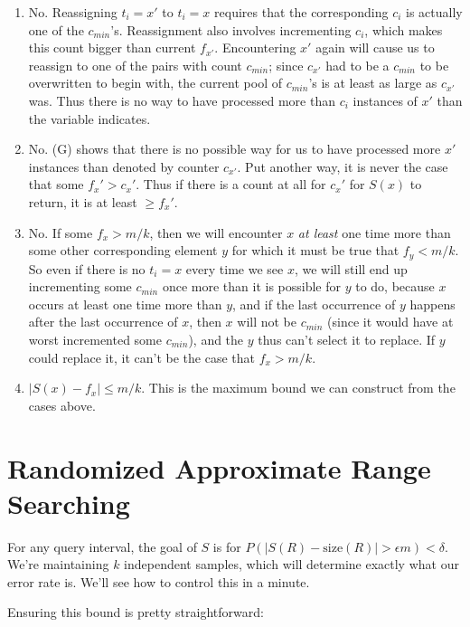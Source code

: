 \documentclass[fleqn]{article}
\begin{document}
\begin{enumerate}
\item No. Reassigning $t_i = x'$ to $t_i = x$ requires that the corresponding $c_i$ is actually one of the $c_{min}$'s. Reassignment also involves incrementing $c_i$, which makes this count bigger than current $f_{x'}$. Encountering $x'$ again will cause us to reassign to one of the pairs with count $c_{min}$; since $c_{x'}$ had to be a $c_{min}$ to be overwritten to begin with, the current pool of $c_{min}$'s is at least as large as $c_{x'}$ was. Thus there is no way to have processed more than $c_i$ instances of $x'$ than the variable indicates.

\item No. (G) shows that there is no possible way for us to have processed more $x'$ instances than denoted by counter $c_{x'}$. Put another way, it is never the case that some $f_x' > c_x'$. Thus if there is a count at all for $c_x'$ for $S(x)$ to return, it is at least $\ge f_x'$.

\item No. If some $f_x > m/k$, then we will encounter $x$ \textit{at least} one time more than some other corresponding element $y$ for which it must be true that $f_{y} < m/k$. So even if there is no $t_i = x$ every time we see $x$, we will still end up incrementing some $c_{min}$ once more than it is possible for $y$ to do, because $x$ occurs at least one time more than $y$, and if the last occurrence of $y$ happens after the last occurrence of $x$, then $x$ will not be $c_{min}$ (since it would have at worst incremented some $c_{min}$), and the $y$ thus can't select it to replace. If $y$ could replace it, it can't be the case that $f_x > m/k$.

\item $|S(x) - f_x| \le m/k$. This is the maximum bound we can construct from the cases above.

\end{enumerate}


\section{Randomized Approximate Range Searching}

For any query interval, the goal of $S$ is for $P(|S(R) - \mbox{size}(R)| > \epsilon m) < \delta$. We're maintaining $k$ independent samples, which will determine exactly what our error rate is. We'll see how to control this in a minute.

Ensuring this bound is pretty straightforward:
\end{document}
